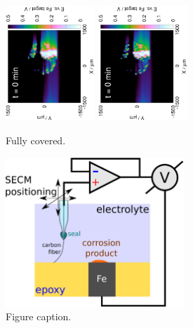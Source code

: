 \documentclass[3p]{elsarticle}
\begin{document}
\begin{figure}[H]
\centering
\includegraphics[trim = 20mm 30mm 0mm 20mm, clip, width=0.3\textwidth, angle=-90]{18012406.eps}
\includegraphics[trim = 20mm 30mm 0mm 20mm, clip, width=0.3\textwidth, angle=-90]{18012406_deconvoluted.eps}
\caption{Fully covered.}
\label{fig:deconvolution}
\end{figure}



\begin{figure}[H]
\centering
\includegraphics[width=0.6\textwidth]{whisker.eps}
\caption{Figure caption.}
\label{fig:deconvolution}
\end{figure}
\end{document}
